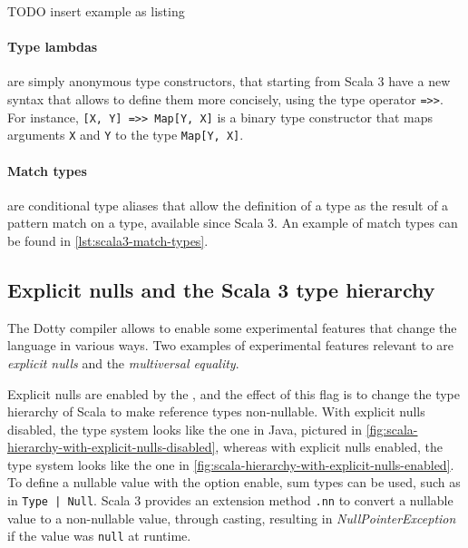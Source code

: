 TODO insert example as listing

\paragraph{Type lambdas} are simply anonymous type constructors, that starting from Scala 3 have a new syntax that allows to define them more concisely, using the type operator \texttt{=>>}.
%
For instance, \texttt{[X, Y] =>> Map[Y, X]} is a binary type constructor that maps arguments \texttt{X} and \texttt{Y} to the type \texttt{Map[Y, X]}.

\paragraph{Match types} are conditional type aliases that allow the definition of a type as the result of a pattern match on a type, available since Scala 3.
%
An example of match types can be found in \cref{lst:scala3-match-types}.



\subsection{Explicit nulls and the Scala 3 type hierarchy} \label{chap:background->sec:scala3->subsec:type-hierarchy} \label{chap:background->sec:scala3->subsec:explicit-nulls}

The Dotty compiler allows to enable some experimental features that change the language in various ways.
%
Two examples of experimental features relevant to \this are \textit{explicit nulls} and the \textit{multiversal equality}.

Explicit nulls are enabled by the , and the effect of this flag is to change the type hierarchy of Scala to make reference types non-nullable.
%
With explicit nulls disabled, the type system looks like the one in Java, pictured in \cref{fig:scala-hierarchy-with-explicit-nulls-disabled}, whereas with explicit nulls enabled, the type system looks like the one in \cref{fig:scala-hierarchy-with-explicit-nulls-enabled}.
%
To define a nullable value with the option enable, sum types can be used, such as in \texttt{Type | Null}.
%
Scala 3 provides an extension method \texttt{.nn} to convert a nullable value to a non-nullable value, through casting, resulting in \textit{NullPointerException} if the value was \texttt{null} at runtime.

